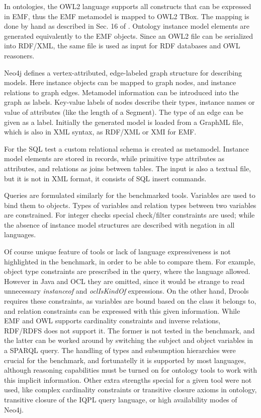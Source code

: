 In ontologies, the OWL2 language supports all constructs that can be expressed in
EMF, thus the EMF metamodel is mapped to OWL2 TBox. The mapping is done by hand as
described in Sec. 16 of \cite{OMG2009ODM}. Ontology instance model elements are
generated equivalently to the EMF objects. Since an OWL2 file can be serialized
into RDF/XML, the same file is used as input for RDF databases and OWL
reasoners.

Neo4j defines a vertex-attributed, edge-labeled graph structure for describing
models. Here instance objects can be mapped to graph nodes, and instance
relations to graph edges. Metamodel information can be introduced into the graph
as labels. Key-value labels of nodes describe their types, instance names or
value of attributes (like the length of a Segment). The type of an edge can be
given as a label. Initially the generated model is loaded from a GraphML file,
which is also in XML syntax, as RDF/XML or XMI for EMF.

For the SQL test a custom relational schema is created as metamodel. Instance
model elements are stored in records, while primitive type attributes as
attributes, and relations as joins between tables. The input is also a textual
file, but it is not in XML format, it consists of SQL insert commands.

Queries are formulated similarly for the benchmarked tools. Variables are used
to bind them to objects. Types of variables and relation types between two
variables are constrained. For integer checks special check/filter constraints
are used; while the absence of instance model structures are described with
negation in all languages.


Of course unique feature of tools or lack of language expressiveness is not
highlighted in the benchmark, in order to be able to compare them. For example,
object type constraints are prescribed in the query, where the language allowed.
However in Java and OCL they are omitted, since it would be strange to read
unnecessary \emph{instanceof} and \emph{oclIsKindOf} expressions. On the other
hand, Drools requires these constraints, as variables are bound based on the
class it belongs to, and relation constraints can be expressed with this given
information. While EMF and OWL supports cardinality constraints and inverse
relations, RDF/RDFS does not support it. The former is not tested in the
benchmark, and the latter can be worked around by switching the subject and
object variables in a SPARQL query.
The handling of types and subsumption hierarchies were crucial for the
benchmark, and fortunatelly it is supported by most languages, although
reasoning capabilities must be turned on for ontology tools to work with this
implicit information. Other extra strengths special for a given tool were not
used, like complex cardinality constraints or transitive closure axioms in
ontology, transitive closure of the IQPL query language, or high availability
modes of Neo4j.

